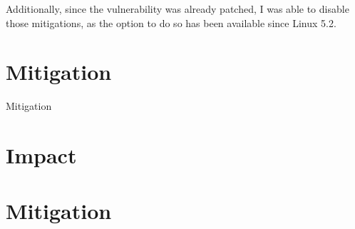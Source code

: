 \documentclass{article}
\begin{document}
Additionally, since the vulnerability was already patched, I was able to disable those mitigations, as the option to do so has been available since Linux 5.2. 

\section{Mitigation}
Mitigation

\section{Impact}

\section{Mitigation}



 
\end{document}
